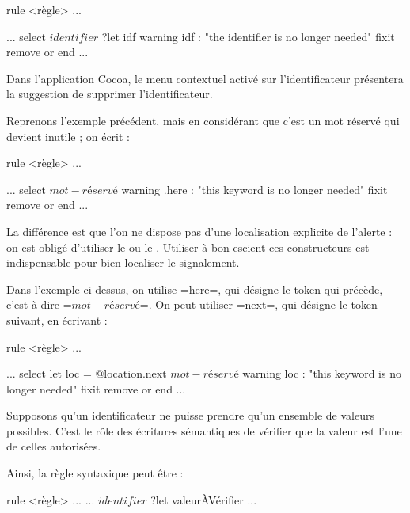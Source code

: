 \begin{galgas}
rule <règle> ... {
  ...
  select
    $identifier$ ?let idf
    warning idf : "the identifier is no longer needed" fixit { remove }
  or
  end
  ...
  
}
\end{galgas}

Dans l'application Cocoa, le menu contextuel activé sur l'identificateur présentera la suggestion de supprimer l'identificateur.



Reprenons l'exemple précédent, mais en considérant que c'est un mot réservé qui devient inutile ; on écrit :

\begin{galgas}
rule <règle> ... {
  ...
  select
    $mot-réservé$
    warning .here : "this keyword is no longer needed" fixit { remove }
  or
  end
  ...
  
}
\end{galgas}

La différence est que l'on ne dispose pas d'une localisation explicite de l'alerte : on est obligé d'utiliser le  ou le . Utiliser à bon escient ces constructeurs est indispensable pour bien localiser le signalement.

Dans l'exemple ci-dessus, on utilise \ggs=here=, qui désigne le token qui précède, c'est-à-dire \ggs=$mot-réservé$=. On peut utiliser \ggs=next=, qui désigne le token suivant, en écrivant :

\begin{galgas}
rule <règle> ... {
  ...
  select
    let loc = @location.next
    $mot-réservé$
    warning loc : "this keyword is no longer needed" fixit { remove }
  or
  end
  ...
  
}
\end{galgas}



Supposons qu'un identificateur ne puisse prendre qu'un ensemble de valeurs possibles. C'est le rôle des écritures sémantiques de vérifier que la valeur est l'une de celles autorisées.

Ainsi, la règle syntaxique peut être :
\begin{galgas}
rule <règle> ... {
  ...
  $identifier$ ?let valeurÀVérifier
  ...
}
\end{galgas}

